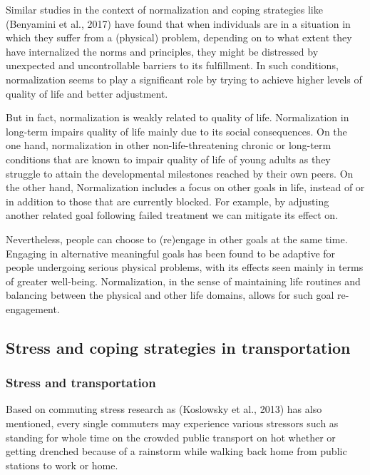 \documentclass[
11pt, %
oneside, %
english, %
singlespacing, %
]{macthesis} %
\begin{document}
Similar studies in the context of normalization and coping strategies like (Benyamini et al., 2017) have found that when individuals are in a situation in which they suffer from a (physical) problem, depending on to what extent they have internalized the norms and principles, they might be distressed by unexpected and uncontrollable barriers to its fulfillment. In such conditions, normalization seems to play a significant role by trying to achieve higher levels of quality of life and better adjustment.

But in fact, normalization is weakly related to quality of life. Normalization in long-term impairs quality of life mainly due to its social consequences. On the one hand, normalization in other non-life-threatening chronic or long-term conditions that are known to impair quality of life of young adults as they struggle to attain the developmental milestones reached by their own peers. On the other hand, Normalization includes a focus on other goals in life, instead of or in addition to those that are currently blocked. For example, by adjusting another related goal following failed treatment we can mitigate its effect on.

Nevertheless, people can choose to (re)engage in other goals at the same time. Engaging in alternative meaningful goals has been found to be adaptive for people undergoing serious physical problems, with its effects seen mainly in terms of greater well-being. Normalization, in the sense of maintaining life routines and balancing between the physical and other life domains, allows for such goal re-engagement.

\hypertarget{stress-and-coping-strategies-in-transportation}{%
\subsection{Stress and coping strategies in transportation}\label{stress-and-coping-strategies-in-transportation}}

\hypertarget{stress-and-transportation-1}{%
\subsubsection{Stress and transportation}\label{stress-and-transportation-1}}

Based on commuting stress research as (Koslowsky et al., 2013) has also mentioned, every single commuters may experience various stressors such as standing for whole time on the crowded public transport on hot whether or getting drenched because of a rainstorm while walking back home from public stations to work or home.
\end{document}
